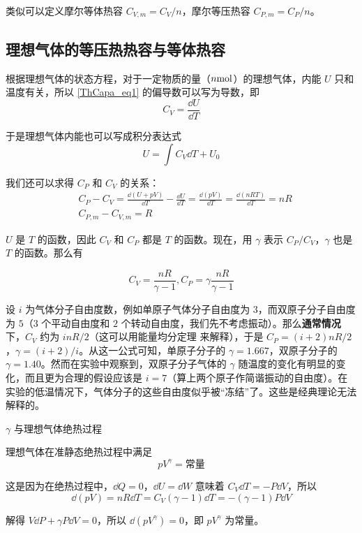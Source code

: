 类似可以定义摩尔等体热容 $C_{V,m}=C_V/n$，摩尔等压热容 $C_{P,m}=C_P/n$。

\subsection{理想气体的等压热热容与等体热容}

根据理想气体的状态方程，对于一定物质的量（$n \rm{mol}$）的理想气体，内能 $U$ 只和温度有关，所以 \autoref{ThCapa_eq1} 的偏导数可以写为导数，即
\begin{equation}
C_V=\frac{\dd U}{\dd T}
\end{equation}

于是理想气体内能也可以写成积分表达式
\begin{equation}
U=\int C_V\dd T + U_0
\end{equation}

我们还可以求得 $C_P$ 和 $C_V$ 的关系：
\begin{equation}
\begin{aligned}
&C_P-C_V=\frac{\dd (U+pV)}{\dd T}-\frac{\dd U}{\dd T}=\frac{\dd(pV)}{\dd T}=\frac{\dd (nRT)}{\dd T}=nR\\
&C_{P,m}-C_{V,m}=R
\end{aligned}
\end{equation}

$U$ 是 $T$ 的函数，因此 $C_V$ 和 $C_P$ 都是 $T$ 的函数。现在，用 $\gamma$ 表示 $C_P/C_V$，$\gamma$ 也是 $T$ 的函数。那么有

\begin{equation}\label{ThCapa_eq4}
C_V=\frac{nR}{\gamma-1},C_P=\gamma\frac{nR}{\gamma-1}
\end{equation}

设 $i$ 为气体分子自由度数，例如单原子气体分子自由度为 $3$，而双原子分子自由度为 $5$（$3$ 个平动自由度和 $2$ 个转动自由度，我们先不考虑振动）。那么\textbf{通常情况}下，$C_V$ 约为 $inR/2$（这可以用能量均分定理 来解释），于是 $C_P=(i+2)nR/2$，$\gamma=(i+2)/i$。从这一公式可知，单原子分子的 $\gamma=1.667$，双原子分子的 $\gamma=1.40$。然而在实验中观察到，双原子分子气体的 $\gamma$ 随温度的变化有明显的变化，而且更为合理的假设应该是 $i=7$（算上两个原子作简谐振动的自由度）。在实验的低温情况下，气体分子的这些自由度似乎被“冻结”了。这些是经典理论无法解释的。
\begin{example}{$\gamma$ 与理想气体绝热过程}

理想气体在准静态绝热过程中满足
\begin{equation}
pV^{\gamma}=\text{常量}
\end{equation}

这是因为在绝热过程中，$\dd{Q}=0$，$\dd{U}=\dd{W}$ 意味着 $C_V\dd{T}=-P\dd{V}$，所以
\begin{equation}
\dd(pV)=nR\dd{T}=C_V(\gamma-1)\dd{T}=-(\gamma-1)P\dd{V}
\end{equation}

解得 $V\dd{P}+\gamma P\dd{V} = 0$，所以 $\dd{(pV^\gamma)}=0$，即 $pV^{\gamma}$ 为常量。
\end{example}

